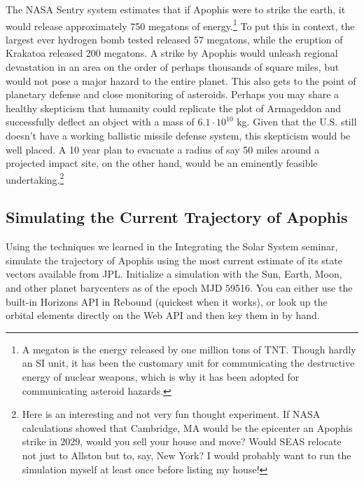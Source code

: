 \documentclass{article}
\begin{document}
The NASA Sentry system estimates that if Apophis were to strike 
the earth, it would release approximately 750 megatons of energy.\footnote{
A megaton is the energy released by one million tons of TNT.  
Though hardly an SI unit, it has been the customary unit for communicating the destructive energy
of nuclear weapons, which is why it has been adopted for communicating asteroid hazards.}
To put this in context, the largest ever hydrogen bomb tested released 57 megatons,
while the eruption of Krakatoa released 200 megatons.
A strike by Apophis would unleash regional devastation in an area on the order of 
perhaps thousands of square miles, but would not pose a major hazard to the entire planet.
This also gets to the point of planetary defense and close monitoring of asteroids.
Perhaps you may share a healthy skepticism that humanity could replicate the plot of 
Armageddon and successfully deflect an object with a mass of $6.1\cdot 10^{10}$ kg.
Given that the U.S. still doesn't have a working ballistic missile defense system,
this skepticism would be well placed.  
A 10 year plan to evacuate a radius of say 50 miles around a projected impact site,
on the other hand, would be an eminently feasible undertaking.\footnote{
Here is an interesting and not very fun thought experiment.
If NASA calculations showed that Cambridge, MA would be the epicenter 
an Apophis strike in 2029, would you sell your house and move?
Would SEAS relocate not just to Allston but to, say, New York?
I would probably want to run the simulation myself at least once before listing my house!}

\subsection*{Simulating the Current Trajectory of Apophis}
Using the techniques we learned in the Integrating the Solar System seminar, 
simulate the trajectory of Apophis using the most current estimate of its state vectors available from JPL.
Initialize a simulation with the Sun, Earth, Moon, and other planet barycenters 
as of the epoch MJD 59516.
You can either use the built-in Horizons API in Rebound (quickest when it works),
or look up the orbital elements directly on the Web API and then key them in by hand.
\end{document}
